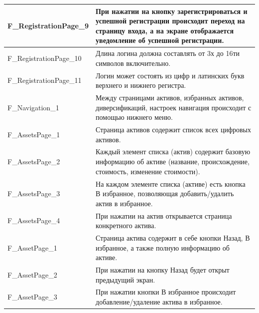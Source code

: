 \documentclass[a4paper, 14pt]{article}
\begin{document}
\begin{longtable}{| p{} | p{} |}
    F\_RegistrationPage\_9          & При нажатии на кнопку зарегистрироваться и успешной регистрации происходит переход на страницу входа, а на экране отображается уведомление об успешной регистрации.                \\ \hline
    F\_RegistrationPage\_10         & Длина логина должна составлять от 3х до 16ти символов включительно.                                                                                                                \\ \hline
    F\_RegistrationPage\_11         & Логин может состоять из цифр и латинских букв верхнего и нижнего регистра.                                                                                                         \\ \hline

    F\_Navigation\_1                & Между страницами активов, избранных активов, диверсификаций, настроек навигация происходит с помощью нижнего меню.                                                                 \\ \hline

    F\_AssetsPage\_1                & Страница активов содержит список всех цифровых активов.                                                                                                                            \\ \hline
    F\_AssetsPage\_2                & Каждый элемент списка (актив) содержит базовую информацию об активе (название, происхождение, стоимость, изменение стоимости).                                                     \\ \hline
    F\_AssetsPage\_3                & На каждом элементе списка (активе) есть кнопка В избранное, позволяющая добавить/удалить актив в избранное.                                                                        \\ \hline
    F\_AssetsPage\_4                & При нажатии на актив открывается страница конкретного актива.                                                                                                                      \\ \hline

    F\_AssetPage\_1                 & Страница актива содержит в себе кнопки Назад, В избранное, а также полную информацию об активе.                                                                                    \\ \hline
    F\_AssetPage\_2                 & При нажатии на кнопку Назад будет открыт предыдущий экран.                                                                                                                         \\ \hline
    F\_AssetPage\_3                 & При нажатии кнопки В избранное происходит добавление/удаление актива в избранное.                                                                                                  \\ \hline


\end{longtable}
\end{document}

